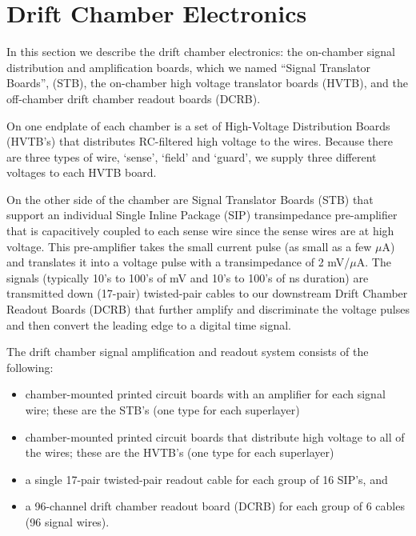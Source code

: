 \section{Drift Chamber Electronics}
In this section we describe the drift chamber electronics:
the on-chamber signal distribution and amplification boards, which
we named ``Signal Translator Boards'', (STB),
the on-chamber high voltage translator boards (HVTB), and the
off-chamber drift chamber readout boards (DCRB).

On one endplate of each chamber is a set of High-Voltage Distribution Boards (HVTB's)
that distributes RC-filtered high voltage to the wires.  Because there are three
types of wire, `sense', `field' and `guard', we supply three different voltages
to each HVTB board.  

On the other side of the chamber are Signal Translator Boards (STB) 
that support an individual Single Inline Package (SIP) transimpedance
pre-amplifier that is capacitively coupled to each sense wire since the
sense wires are at high voltage.  This pre-amplifier takes the
small current pulse (as small as a few $\mu$A) and translates it into a voltage 
pulse with a transimpedance of 2 mV/$\mu$A.  The signals (typically
10's to 100's of mV and 10's to 100's of ns duration) are
transmitted down (17-pair) twisted-pair cables to our downstream
Drift Chamber Readout Boards (DCRB) that further amplify and
discriminate the voltage pulses and then convert the leading edge
to a digital time signal.


The drift chamber signal amplification and readout system consists of the 
following:
\begin{itemize}
\item  chamber-mounted printed circuit boards with an amplifier for each signal wire; 
these are the STB's (one type for each superlayer)
\item  chamber-mounted printed circuit boards that distribute high voltage
to all of the wires; these are the HVTB's (one type for each superlayer)
\item a single 17-pair twisted-pair readout cable for each group of 16
SIP's, and
\item a 96-channel drift chamber readout board (DCRB) for each group
of 6 cables (96 signal wires).
\end{itemize}

